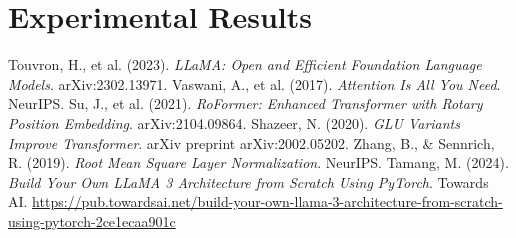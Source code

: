 \documentclass[11pt,a4paper]{article}
\begin{document}
\section{Experimental Results}

\begin{table}[htbp]
\centering
{}
\caption{Validation loss progression across training runs within the 7-epoch limit.}
\label{tab:results}
\end{table}

\clearpage
\begin{thebibliography}{9}
 Touvron, H., et al. (2023). \textit{LLaMA: Open and Efficient Foundation Language Models}. arXiv:2302.13971.
 Vaswani, A., et al. (2017). \textit{Attention Is All You Need}. NeurIPS.
 Su, J., et al. (2021). \textit{RoFormer: Enhanced Transformer with Rotary Position Embedding}. arXiv:2104.09864.
 Shazeer, N. (2020). \textit{GLU Variants Improve Transformer}. arXiv preprint arXiv:2002.05202.
 Zhang, B., \& Sennrich, R. (2019). \textit{Root Mean Square Layer Normalization}. NeurIPS.
 Tamang, M. (2024). \textit{Build Your Own LLaMA 3 Architecture from Scratch Using PyTorch}. Towards AI. \url{https://pub.towardsai.net/build-your-own-llama-3-architecture-from-scratch-using-pytorch-2ce1ecaa901c}
\end{thebibliography}
\end{document}
